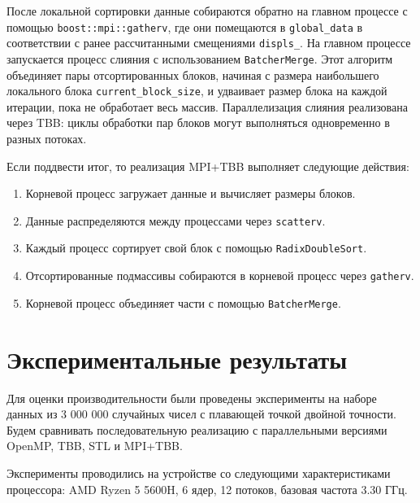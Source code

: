 \documentclass[12pt,a4paper]{extarticle}
\begin{document}
	После локальной сортировки данные собираются обратно на главном процессе с помощью  \texttt{boost::mpi::gatherv}, где они помещаются в  \texttt{global\_data} в соответствии с ранее рассчитанными смещениями  \texttt{displs\_}. На главном процессе запускается процесс слияния с использованием  \texttt{BatcherMerge}. Этот алгоритм объединяет пары отсортированных блоков, начиная с размера наибольшего локального блока  \texttt{current\_block\_size}, и удваивает размер блока на каждой итерации, пока не обработает весь массив. Параллелизация слияния реализована через TBB: циклы обработки пар блоков могут выполняться одновременно в разных потоках.
	
	Если поддвести итог, то реализация MPI+TBB выполняет следующие действия:
	\begin{enumerate}
		\item  Корневой процесс загружает данные и вычисляет размеры блоков.
		\item Данные распределяются между процессами через \texttt{scatterv}.
		\item  Каждый процесс сортирует свой блок с помощью \texttt{RadixDoubleSort}.
		\item  Отсортированные подмассивы собираются в корневой процесс через \texttt{gatherv}.
		\item  Корневой процесс объединяет части с помощью \texttt{BatcherMerge}.
	\end{enumerate}
	
	
	\section{Экспериментальные результаты}
	Для оценки производительности были проведены эксперименты на наборе данных из 3 000 000 случайных чисел с плавающей точкой двойной точности. Будем сравнивать последовательную реализацию с параллельными версиями OpenMP, TBB, STL и MPI+TBB. 
	
	Эксперименты проводились на устройстве со следующими характеристиками процессора: AMD Ryzen 5 5600H, 6 ядер, 12 потоков, базовая частота 3.30  ГГц.
	
\end{document}
